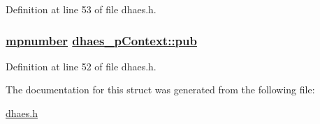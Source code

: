 Definition at line 53 of file dhaes.h.\hypertarget{structdhaes__pContext_o1}{
\subsubsection[pub]{\setlength{\rightskip}{0pt plus 5cm}\hyperlink{structmpnumber}{mpnumber} \hyperlink{structdhaes__pContext_o1}{dhaes\_\-p\-Context::pub}}}
\label{structdhaes__pContext_o1}


Definition at line 52 of file dhaes.h.

The documentation for this struct was generated from the following file:\begin{CompactItemize}
\item 
\hyperlink{dhaes_8h}{dhaes.h}\end{CompactItemize}
